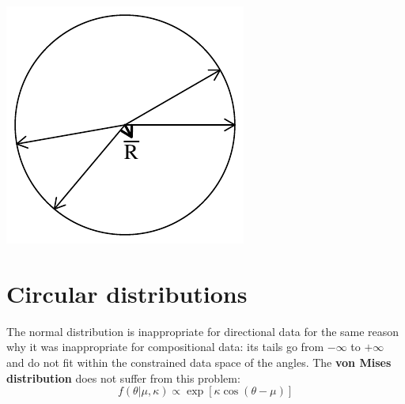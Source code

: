\noindent\begin{minipage}[t][][b]{.2\textwidth}
\includegraphics[width=\textwidth]{../figures/lowconcentration.pdf}\medskip
\end{minipage}
\begin{minipage}[t][][t]{.8\textwidth}
  \label{fig:lowconcentration}
\end{minipage}

\section{Circular distributions}
\label{sec:circular-distributions}

The normal distribution is inappropriate for directional data for the
same reason why it was inappropriate for compositional data: its tails
go from $-\infty$ to $+\infty$ and do not fit within the constrained
data space of the angles. The \textbf{von Mises distribution} does not
suffer from this problem:
\begin{equation}
  f(\theta|\mu,\kappa) \propto \exp[\kappa \cos(\theta-\mu)]
  \label{eq:vonMises}
\end{equation}

